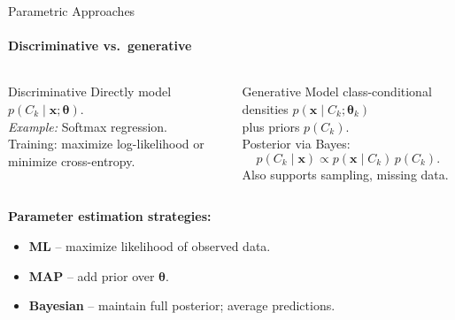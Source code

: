 \begin{frame}{Parametric Approaches}
  \framesubtitle{Discriminative vs.\ generative}
  \begin{columns}[T]
      \begin{block}{Discriminative}
        Directly model $p(C_k\mid\mathbf{x};\boldsymbol\theta)$.\\[4pt]
        \emph{Example:} Softmax regression.\\[4pt]
        Training: maximize log-likelihood or minimize cross-entropy.
      \end{block}
      \begin{block}{Generative}
        Model class-conditional densities $p(\mathbf{x}\mid C_k;\boldsymbol\theta_k)$\\
        plus priors $p(C_k)$.\\[4pt]
        Posterior via Bayes:
        \[p(C_k\mid\mathbf{x})\propto p(\mathbf{x}\mid C_k)\,p(C_k).\]
        Also supports sampling, missing data.
      \end{block}
  \end{columns}
  \bigskip
  \textbf{Parameter estimation strategies:}
  \begin{itemize}
    \item \textbf{ML} – maximize likelihood of observed data.
    \item \textbf{MAP} – add prior over $\boldsymbol\theta$.
    \item \textbf{Bayesian} – maintain full posterior; average predictions.
  \end{itemize}
\end{frame}

